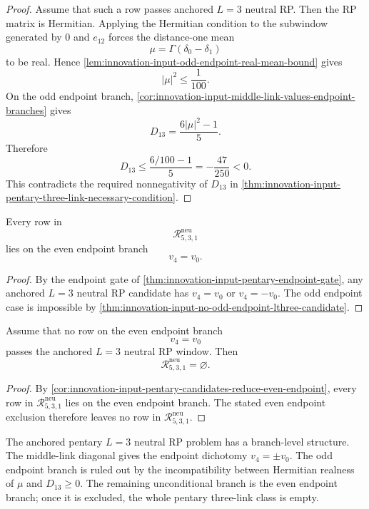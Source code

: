 \begin{proof}
Assume that such a row passes anchored $L=3$ neutral RP. Then the RP
matrix is Hermitian. Applying the Hermitian condition to the subwindow
generated by $0$ and $e_{12}$ forces the distance-one mean
$$
\mu=\Gamma(\delta_0-\delta_1)
$$
to be real. Hence
\autoref{lem:innovation-input-odd-endpoint-real-mean-bound} gives
$$
|\mu|^2\le\frac1{100}.
$$
On the odd endpoint branch,
\autoref{cor:innovation-input-middle-link-values-endpoint-branches} gives
$$
D_{13}=\frac{6|\mu|^2-1}{5}.
$$
Therefore
$$
D_{13}
\le
\frac{6/100-1}{5}
=
-\frac{47}{250}
<0.
$$
This contradicts the required nonnegativity of $D_{13}$ in
\autoref{thm:innovation-input-pentary-three-link-necessary-condition}.
\end{proof}

\begin{corollary}
\label{cor:innovation-input-pentary-candidates-reduce-even-endpoint}
Every row in
$$
\mathcal R_{5,3,1}^{\mathrm{neu}}
$$
lies on the even endpoint branch
$$
v_4=v_0.
$$
\end{corollary}

\begin{proof}
By the endpoint gate of
\autoref{thm:innovation-input-pentary-endpoint-gate}, any anchored
$L=3$ neutral RP candidate has $v_4=v_0$ or $v_4=-v_0$. The odd endpoint
case is impossible by
\autoref{thm:innovation-input-no-odd-endpoint-lthree-candidate}.
\end{proof}

\begin{theorem}
\label{thm:innovation-input-even-endpoint-exclusion-closes-pentary}
Assume that no row on the even endpoint branch
$$
v_4=v_0
$$
passes the anchored $L=3$ neutral RP window. Then
$$
\mathcal R_{5,3,1}^{\mathrm{neu}}=\varnothing.
$$
\end{theorem}

\begin{proof}
By
\autoref{cor:innovation-input-pentary-candidates-reduce-even-endpoint},
every row in $\mathcal R_{5,3,1}^{\mathrm{neu}}$ lies on the even
endpoint branch. The stated even endpoint exclusion therefore leaves no
row in $\mathcal R_{5,3,1}^{\mathrm{neu}}$.
\end{proof}

\begin{principle}
\label{prin:innovation-input-pentary-branch-ledger}
The anchored pentary $L=3$ neutral RP problem has a branch-level
structure. The middle-link diagonal gives the endpoint dichotomy
$v_4=\pm v_0$. The odd endpoint branch is ruled out by the incompatibility
between Hermitian realness of $\mu$ and $D_{13}\ge0$. The remaining
unconditional branch is the even endpoint branch; once it is excluded,
the whole pentary three-link class is empty.
\end{principle}

